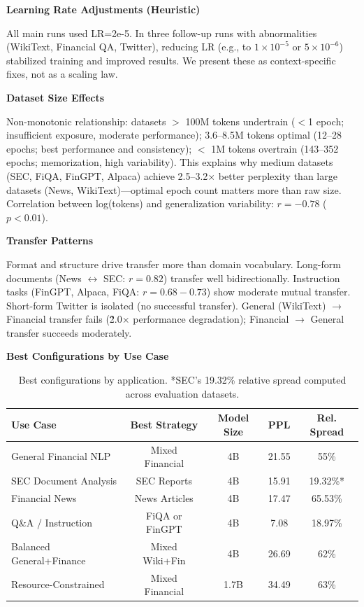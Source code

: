 \textbf{Learning Rate Adjustments (Heuristic)}

All main runs used LR=2e-5. In three follow-up runs with abnormalities (WikiText, Financial QA, Twitter), reducing LR (e.g., to $1\times10^{-5}$ or $5\times10^{-6}$) stabilized training and improved results. We present these as context-specific fixes, not as a scaling law.

\textbf{Dataset Size Effects}

Non-monotonic relationship: datasets $>$ 100M tokens undertrain ($<$1 epoch; insufficient exposure, moderate performance); 3.6–8.5M tokens optimal (12–28 epochs; best performance and consistency); $<$ 1M tokens overtrain (143–352 epochs; memorization, high variability). This explains why medium datasets (SEC, FiQA, FinGPT, Alpaca) achieve 2.5–3.2$\times$ better perplexity than large datasets (News, WikiText)—optimal epoch count matters more than raw size. Correlation between log(tokens) and generalization variability: $r = -0.78$ ($p < 0.01$).

\textbf{Transfer Patterns}

Format and structure drive transfer more than domain vocabulary. Long-form documents (News $\leftrightarrow$ SEC: $r = 0.82$) transfer well bidirectionally. Instruction tasks (FinGPT, Alpaca, FiQA: $r = 0.68-0.73$) show moderate mutual transfer. Short-form Twitter is isolated (no successful transfer). General (WikiText) $\to$ Financial transfer fails (\~2.0$\times$ performance degradation); Financial $\to$ General transfer succeeds moderately.

\textbf{Best Configurations by Use Case}

\begin{table}[h]
\centering
\small
\begin{tabular}{lcccc}
\toprule
\textbf{Use Case} & \textbf{Best Strategy} & \textbf{Model Size} & \textbf{PPL} & \textbf{Rel. Spread} \\
\midrule
General Financial NLP & Mixed Financial & 4B & 21.55 & 55\% \\
SEC Document Analysis & SEC Reports & 4B & 15.91 & 19.32\%* \\
Financial News & News Articles & 4B & 17.47 & 65.53\% \\
Q\&A / Instruction & FiQA or FinGPT & 4B & 7.08 & 18.97\% \\
Balanced General+Finance & Mixed Wiki+Fin & 4B & 26.69 & 62\% \\
Resource-Constrained & Mixed Financial & 1.7B & 34.49 & 63\% \\
\bottomrule
\end{tabular}
\caption[Best Configurations by Application]{Best configurations by application. *SEC's 19.32\% relative spread computed across evaluation datasets.}
\end{table}


